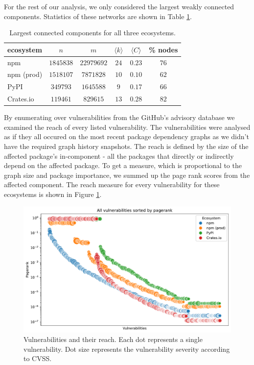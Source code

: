 \documentclass[9pt,twocolumn,twoside]{pnas-report}
\begin{document}
For the rest of our analysis, we only considered the largest weakly connected components.
Statistics of these networks are shown in Table \ref{tab:lcc_stats}.

\begin{table}[h]\centering%
	\caption{Largest connected components for all three ecosystems.}
	\begin{tabular}{l|ccccc}
		ecosystem  & $n$       & $m$        & $\langle k\rangle$ & $\langle C\rangle$ & \% nodes \\\hline
		npm        & $1845838$ & $22979692$ & $24$               & $0.23$             & $76$     \\
		npm (prod) & $1518107$ & $7871828$  & $10$               & $0.10$             & $62$     \\
		PyPI       & $349793$  & $1645588$  & $9$                & $0.17$             & $66$     \\
		Crates.io  & $119461$  & $829615$   & $13$               & $0.28$             & $82$     \\
	\end{tabular}
	\label{tab:lcc_stats}
\end{table}

By enumerating over vulnerabilities from the GitHub's advisory database we examined the reach of every listed vulnerability.
The vulnerabilities were analysed as if they all occured on the most recent package dependency graphs as we didn't have the required graph history snapshots.
The reach is defined by the size of the affected package's in-component - all the packages that directly or indirectly depend on the affected package.
To get a measure, which is proportional to the graph size and package importance, we summed up the page rank scores from the affected component.
The reach measure for every vulnerability for these ecosystems is shown in Figure \ref{fig:reach}.

\begin{figure}[t]\centering%
	\includegraphics[width=\linewidth]{vuln_pagerank}
	\caption{Vulnerabilities and their reach. Each dot represents a single vulnerability. Dot size represents the vulnerability severity according to CVSS.  }
	\label{fig:reach}
\end{figure}
\end{document}
